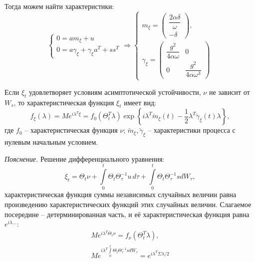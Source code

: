 \begin{ex}
  Тогда можем найти характеристики:
  \[
    \begin{cases}
      0 = am_\xi + u\\
      0 = a\gamma_\xi + \gamma_\xi a^T + ss^T
    \end{cases}
    \Rightarrow
    \begin{cases}
      m_\xi = \begin{pmatrix} \dfrac{2\alpha\delta}{\omega} \\ - \delta \end{pmatrix} , \\
      \gamma_\xi = \begin{pmatrix}
        \dfrac{g^2}{4\alpha\omega} & 0 \\
        0 & \dfrac{g^2}{4\alpha\omega^3}
      \end{pmatrix} 
    \end{cases}
  \]
\end{ex}


\begin{theorem}
  Если $\xi_t$ удовлетворяет условиям асимптотической устойчивости, $\nu$ не зависит от $W_s$, то
  характеристическая функция $\xi_t$ имеет вид:
  \[
    f_\xi(\lambda) = M e^{i\lambda^T \xi} = f_0 \left( \Theta_t^T \lambda\right) \exp \left\{ i\lambda^T \check{m}_\xi(t) - \dfrac{1}{2} \lambda^T \check{\gamma}_\xi (t) \lambda \right\},
  \]
  где $f_0$ -- характеристическая функция $\nu$;
  $\check{m}_\xi, \check{\gamma}_\xi$ -- характеристики процесса с нулевым начальным условием.
\end{theorem}

\textit{Пояснение.} Решение дифференциального уравнения:
\[
  \xi_t = \Theta_t \nu + \int\limits_0^t \Theta_t \Theta^{-1}_\tau u \, d\tau + \int\limits_0^t \Theta_t \Theta^{-1}_\tau s dW_\tau,
\]
характеристическая функция суммы независимых случайных величин равна произведению
характеристических функций этих случайных величин. Слагаемое посередине -- детерминированная часть,
и её характеристическая функция равна $e^{i\lambda \dots}$:
\begin{align*}
  M e^{i\lambda^T \Theta_t \nu} = f_\nu \left( \Theta_t^T \lambda \right), \\
  M e^{i\lambda^T \int\limits_0^t \Theta_t \Theta^{-1}_\tau s dW_\tau} = e^{i \lambda^T \Sigma \lambda/2}
\end{align*}

